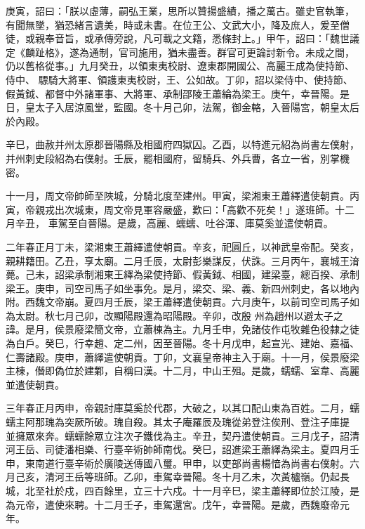 \begin{pinyinscope}
 庚寅，詔曰：「朕以虛薄，嗣弘王業，思所以贊揚盛績，播之萬古。雖史官執筆，有聞無墜，猶恐緒言遺美，時或未書。在位王公、文武大小，降及庶人，爰至僧徒，或親奉音旨，或承傳旁說，凡可載之文籍，悉條封上。」甲午，詔曰：「魏世議定《麟趾格》，遂為通制，官司施用，猶未盡善。群官可更論討新令。未成之間，仍以舊格從事。」九月癸丑，以領東夷校尉、遼東郡開國公、高麗王成為使持節、侍中、
 驃騎大將軍、領護東夷校尉，王、公如故。丁卯，詔以梁侍中、使持節、假黃鉞、都督中外諸軍事、大將軍、承制邵陵王蕭綸為梁王。庚午，幸晉陽。是日，皇太子入居涼風堂，監國。冬十月己卯，法駕，御金輅，入晉陽宮，朝皇太后於內殿。



 辛巳，曲赦并州太原郡晉陽縣及相國府四獄囚。乙酉，以特進元紹為尚書左僕射，并州刺史段紹為右僕射。壬辰，罷相國府，留騎兵、外兵曹，各立一省，別掌機密。



 十一月，周文帝帥師至陜城，分騎北度至建州。甲寅，梁湘東王蕭繹遣使朝貢。丙寅，帝親戎出次城東，周文帝見軍容嚴盛，歎曰：「高歡不死矣！」遂班師。十二月辛丑，
 車駕至自晉陽。是歲，高麗、蠕蠕、吐谷渾、庫莫奚並遣使朝貢。



 二年春正月丁未，梁湘東王蕭繹遣使朝貢。辛亥，祀圓丘，以神武皇帝配。癸亥，親耕籍田。乙丑，享太廟。二月壬辰，太尉彭樂謀反，伏誅。三月丙午，襄城王淯薨。己未，詔梁承制湘東王繹為梁使持節、假黃鉞、相國，建梁臺，總百揆、承制梁王。庚申，司空司馬子如坐事免。是月，梁交、梁、義、新四州刺史，各以地內附。西魏文帝崩。夏四月壬辰，梁王蕭繹遣使朝貢。六月庚午，以前司空司馬子如為太尉。秋七月己卯，改顯陽殿還為昭陽殿。辛卯，改殷
 州為趙州以避太子之諱。是月，侯景廢梁簡文帝，立蕭棟為主。九月壬申，免諸伎作屯牧雜色役隸之徒為白戶。癸巳，行幸趙、定二州，因至晉陽。冬十月戊申，起宣光、建始、嘉福、仁壽諸殿。庚申，蕭繹遣使朝貢。丁卯，文襄皇帝神主入于廟。十一月，侯景廢梁主棟，僭即偽位於建鄴，自稱曰漢。十二月，中山王殂。是歲，蠕蠕、室韋、高麗並遣使朝貢。



 三年春正月丙申，帝親討庫莫奚於代郡，大破之，以其口配山東為百姓。二月，蠕蠕主阿那瑰為突厥所破。瑰自殺。其太子庵羅辰及瑰從弟登注俟刑、登注子庫提
 並擁眾來奔。蠕蠕餘眾立注次子鐵伐為主。辛丑，契丹遣使朝貢。三月戊子，詔清河王岳、司徒潘相樂、行臺辛術帥師南伐。癸巳，詔進梁王蕭繹為梁主。夏四月壬申，東南道行臺辛術於廣陵送傳國八璽。甲申，以吏部尚書楊愔為尚書右僕射。六月己亥，清河王岳等班師。乙卯，車駕幸晉陽。冬十月乙未，次黃櫨嶺。仍起長城，北至社於戍，四百餘里，立三十六戍。十一月辛巳，梁主蕭繹即位於江陵，是為元帝，遣使來聘。十二月壬子，車駕還宮。戊午，幸晉陽。是歲，西魏廢帝元年。




\end{pinyinscope}
